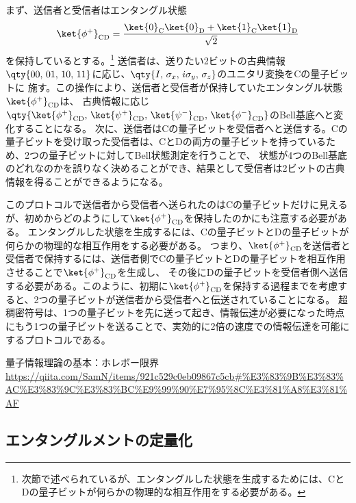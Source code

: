 \documentclass[a4paper,11pt,uplatex]{jsarticle}%
\begin{document}
まず、送信者と受信者はエンタングル状態
\begin{equation}
  \ket{\phi^{+}}_{\text{CD}} = \frac{\ket{0}_{\text{C}}\ket{0}_{\text{D}} + \ket{1}_{\text{C}}\ket{1}_{\text{D}}}{\sqrt{2}}
\end{equation}
を保持しているとする。\footnote{次節で述べられているが、エンタングルした状態を生成するためには、CとDの量子ビットが何らかの物理的な相互作用をする必要がある。}
送信者は、送りたい2ビットの古典情報$\qty{00,\,01,\,10,\,11}$に応じ、$\qty{I,\,\sigma_x,\,i\sigma_y,\,\sigma_z}$のユニタリ変換を$\text{C}$の量子ビットに
施す。この操作により、送信者と受信者が保持していたエンタングル状態$\ket{\phi^{+}}_{\text{CD}}$は、
古典情報に応じ$\qty{\ket{\phi^{+}}_{\text{CD}},\,\ket{\psi^{+}}_{\text{CD}},\,\ket{\psi^{-}}_{\text{CD}},\,\ket{\phi^{-}}_{\text{CD}}}$のBell基底へと変化することになる。
次に、送信者はCの量子ビットを受信者へと送信する。Cの量子ビットを受け取った受信者は、CとDの両方の量子ビットを持っているため、2つの量子ビットに対してBell状態測定を行うことで、
状態が4つのBell基底のどれなのかを誤りなく決めることができ、結果として受信者は2ビットの古典情報を得ることができるようになる。

このプロトコルで送信者から受信者へ送られたのはCの量子ビットだけに見えるが、初めからどのようにして$\ket{\phi^{+}}_{\text{CD}}$を保持したのかにも注意する必要がある。
エンタングルした状態を生成するには、Cの量子ビットとDの量子ビットが何らかの物理的な相互作用をする必要がある。
つまり、$\ket{\phi^{+}}_{\text{CD}}$を送信者と受信者で保持するには、送信者側でCの量子ビットとDの量子ビットを相互作用させることで$\ket{\phi^{+}}_{\text{CD}}$を生成し、
その後にDの量子ビットを受信者側へ送信する必要がある。このように、初期に$\ket{\phi^{+}}_{\text{CD}}$を保持する過程までを考慮すると、2つの量子ビットが送信者から受信者へと伝送されていることになる。
超稠密符号は、1つの量子ビットを先に送って起き、情報伝達が必要になった時点にもう1つの量子ビットを送ることで、実効的に2倍の速度での情報伝達を可能にするプロトコルである。



\begin{thebibliography}{9}
    量子情報理論の基本：ホレボー限界 \url{https://qiita.com/SamN/items/921c529c0eb09867c5cb#%E3%83%9B%E3%83%AC%E3%83%9C%E3%83%BC%E9%99%90%E7%95%8C%E3%81%A8%E3%81%AF}
\end{thebibliography}

\subsection{エンタングルメントの定量化}
\end{document}

